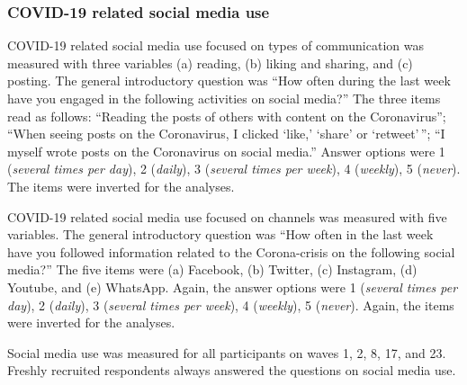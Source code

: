 \documentclass[
  english,
  man,mask,floatsintext]{apa6}
\begin{document}
\hypertarget{covid-19-related-social-media-use}{%
\subsubsection{COVID-19 related social media use}\label{covid-19-related-social-media-use}}

COVID-19 related social media use focused on types of communication was measured with three variables (a) reading, (b) liking and sharing, and (c) posting.
The general introductory question was ``How often during the last week have you engaged in the following activities on social media?''
The three items read as follows:
``Reading the posts of others with content on the Coronavirus''; ``When seeing posts on the Coronavirus, I clicked `like,' `share' or `retweet'\,''; ``I myself wrote posts on the Coronavirus on social media.''
Answer options were 1 (\emph{several times per day}), 2 (\emph{daily}), 3 (\emph{several times per week}), 4 (\emph{weekly}), 5 (\emph{never}).
The items were inverted for the analyses.

COVID-19 related social media use focused on channels was measured with five variables.
The general introductory question was ``How often in the last week have you followed information related to the Corona-crisis on the following social media?''
The five items were (a) Facebook, (b) Twitter, (c) Instagram, (d) Youtube, and (e) WhatsApp.
Again, the answer options were 1 (\emph{several times per day}), 2 (\emph{daily}), 3 (\emph{several times per week}), 4 (\emph{weekly}), 5 (\emph{never}).
Again, the items were inverted for the analyses.

Social media use was measured for all participants on waves 1, 2, 8, 17, and 23.
Freshly recruited respondents always answered the questions on social media use.
\end{document}

